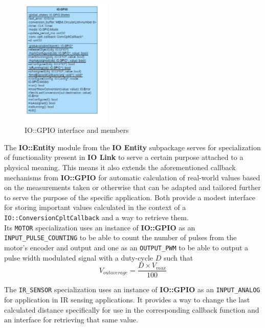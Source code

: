 \begin{figure}[H]
	\centering
	\includegraphics[width=0.38\textwidth]{./img/navig-class-gpio.png}
	\caption {IO::GPIO interface and members}
	\label{fig:navig-class-gpio}
	\end{figure}


The \textbf{IO::Entity} module from the \textbf{IO Entity} subpackage serves for specialization of functionality present in \textbf{IO Link} to serve a certain purpose attached to a physical meaning. This means it also extends the aforementioned callback mechanisms from \textbf{IO::GPIO} for automatic calculation of real-world values based on the measurements taken or otherwise that can be adapted and tailored further to serve the purpose of the specific application. Both provide a modest interface for storing important values calculated in the context of a \texttt{IO::ConversionCpltCallback} and a way to retrieve them.\\

Its \texttt{MOTOR} specialization uses an instance of \textbf{IO::GPIO} as an \texttt{INPUT\_PULSE\_COUNTING} to be able to count the number of pulses from the motor's encoder and output and one as an \texttt{OUTPUT\_PWM} to be able to output a pulse width modulated signal with a duty-cycle $D$ such that 
$$
V_{out average} = \frac{D\times V_{max}}{100}
$$

The \texttt{IR\_SENSOR} specialization uses an instance of \textbf{IO::GPIO} as an \texttt{INPUT\_ANALOG} for application in IR sensing applications. It provides a way to change the last calculated distance specifically for use in the corresponding callback function and an interface for retrieving that same value.

